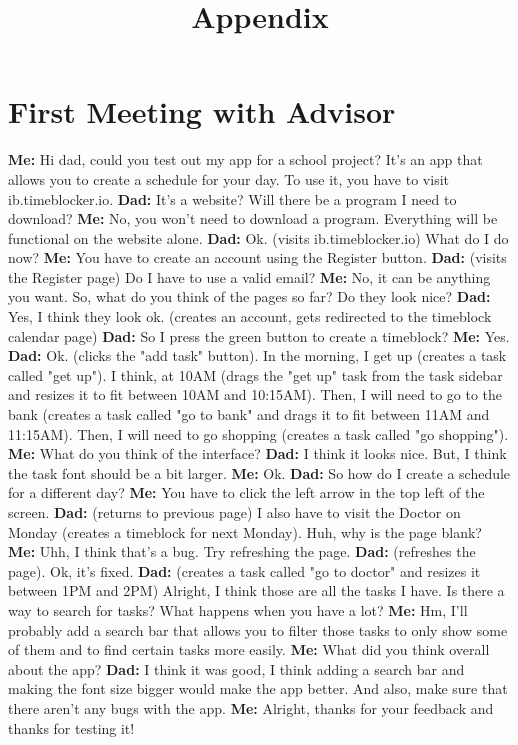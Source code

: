\documentclass[12pt]{report}
\title{Appendix}
\begin{document}
\centerline{\textcolor{msblue}{
		\textbf{\fontsize{13}{13}\MyTitle}
	}}


\bgroup\obeylines
\section*{First Meeting with Advisor}
\textbf{Me:} Hi dad, could you test out my app for a school project? It's an app that allows you to create a schedule for your day. To use it, you have to visit ib.timeblocker.io.
\textbf{Dad:} It's a website? Will there be a program I need to download?
\textbf{Me:} No, you won't need to download a program. Everything will be functional on the website alone.
\textbf{Dad:} Ok. (visits ib.timeblocker.io) What do I do now?
\textbf{Me:} You have to create an account using the Register button.
\textbf{Dad:} (visits the Register page) Do I have to use a valid email?
\textbf{Me:} No, it can be anything you want. So, what do you think of the pages so far? Do they look nice?
\textbf{Dad:} Yes, I think they look ok. (creates an account, gets redirected to the timeblock calendar page)
\textbf{Dad:} So I press the green button to create a timeblock?
\textbf{Me:} Yes.
\textbf{Dad:} Ok. (clicks the "add task" button). In the morning, I get up (creates a task called "get up"). I think, at 10AM (drags the "get up" task from the task sidebar and resizes it to fit between 10AM and 10:15AM). Then, I will need to go to the bank (creates a task called "go to bank" and drags it to fit between 11AM and 11:15AM). Then, I will need to go shopping (creates a task called "go shopping").
\textbf{Me:} What do you think of the interface?
\textbf{Dad:} I think it looks nice. But, I think the task font should be a bit larger.
\textbf{Me:} Ok.
\textbf{Dad:} So how do I create a schedule for a different day?
\textbf{Me:} You have to click the left arrow in the top left of the screen.
\textbf{Dad:} (returns to previous page) I also have to visit the Doctor on Monday (creates a timeblock for next Monday). Huh, why is the page blank?
\textbf{Me:} Uhh, I think that's a bug. Try refreshing the page.
\textbf{Dad:} (refreshes the page). Ok, it's fixed.
\textbf{Dad:} (creates a task called "go to doctor" and resizes it between 1PM and 2PM) Alright, I think those are all the tasks I have. Is there a way to search for tasks? What happens when you have a lot?
\textbf{Me:} Hm, I'll probably add a search bar that allows you to filter those tasks to only show some of them and to find certain tasks more easily.
\textbf{Me:} What did you think overall about the app?
\textbf{Dad:} I think it was good, I think adding a search bar and making the font size bigger would make the app better. And also, make sure that there aren't any bugs with the app.
\textbf{Me:} Alright, thanks for your feedback and thanks for testing it!
\end{document}
